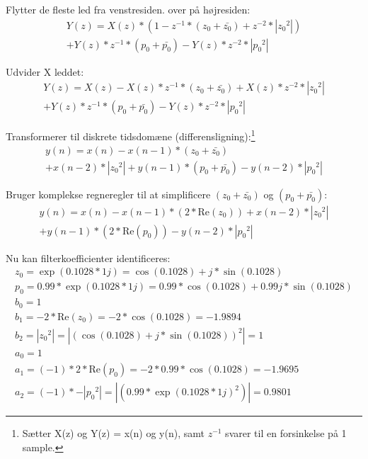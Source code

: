 \documentclass[a4paper,onecolumn,oneside]{report}
\begin{document}
Flytter de fleste led fra venstresiden. over på højresiden:
\begin{equation}
    \begin{split}
    Y(z) = X(z) * (1 - z^{-1}*(z_0+\bar{z_0}) + z^{-2}*|{z_0}^2|) \\
    + Y(z)* z^{-1}*(p_0 +\bar{p_0}) - Y(z)*z^{-2}*|{p_0}^2|
    \end{split}
\end{equation}

Udvider X leddet:
\begin{equation}
    \begin{split}
    Y(z) = X(z) - X(z) *z^{-1}*(z_0+\bar{z_0}) + X(z) * z^{-2}*|{z_0}^2|\\ + Y(z)* z^{-1}*(p_0 +\bar{p_0}) - Y(z)*z^{-2}*|{p_0}^2|
    \end{split}
\end{equation}

Transformerer til diskrete tidsdomæne (differensligning):\footnote{Sætter X(z) og Y(z) = x(n) og y(n), samt $z^{-1}$ svarer til en forsinkelse på 1 sample.}
\begin{equation}
    \begin{split}
    y(n) = x(n) - x(n-1) *(z_0+\bar{z_0}) \\
    + x(n-2)*|{z_0}^2| + y(n-1)*(p_0 +\bar{p_0}) - y(n-2)*|{p_0}^2|
    \end{split}
\end{equation}


Bruger komplekse regneregler til at simplificere $(z_0 +\bar{z_0})$ og $(p_0 +\bar{p_0})$:
\begin{equation}
    \begin{split}
    y(n) = x(n) - x(n-1) *(2*\textrm{Re}(z_0)) + x(n-2)*|{z_0}^2| \\
     + y(n-1)*(2*\textrm{Re}(p_0)) - y(n-2)*|{p_0}^2|
    \end{split}
\end{equation}

Nu kan filterkoefficienter identificeres:
\begin{equation}
    \begin{split}
        z_0  = \exp(0.1028*1j) = \cos(0.1028) + j*\sin(0.1028) \\
        p_0 = 0.99*\exp(0.1028*1j) = 0.99*\cos(0.1028) + 0.99j*\sin(0.1028)\\
        b_0 = 1\\
        b_1 = -2*\textrm{Re}(z_0) = -2*\cos(0.1028) = -1.9894\\
        b_2 = |{z_0}^2| = |(\cos(0.1028)+j*\sin(0.1028))^2| = 1 \\
        a_0 = 1\\
        a_1 = (-1)*2*\textrm{Re}(p_0) = -2*0.99*\cos(0.1028) = -1.9695\\
        a_2 = (-1)* -|{p_0}^2| = |(0.99*\exp(0.1028*1j)^2)| = 0.9801
    \end{split}
    \label{eq:opgave2_f:done}
\end{equation}
\end{document}
